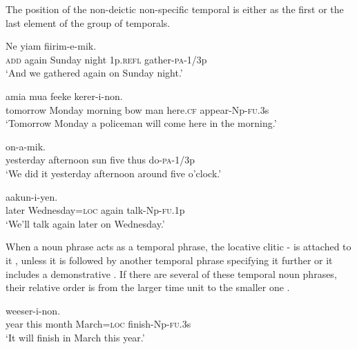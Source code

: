 The position of the non-deictic non-specific temporal is either as the first  or the last element  of the group of temporals.

\ea%
\label{ex:4:x874}
\gll Ne      yiam  fiirim-e-mik. \\
\textsc{add}  again  Sunday  night  1p.\textsc{refl}  gather-\textsc{pa}-1/3p      \\
\glt`And we gathered again on Sunday night.'
\z

\ea%
\label{ex:4:x875}
\gll {}     amia  mua  feeke  kerer-i-non. \\
 tomorrow  Monday  morning  bow  man  here.\textsc{cf}  appear-Np-\textsc{fu}.3s     \\
\glt`Tomorrow Monday a policeman will come here in the morning.'
\z

\ea%
\label{ex:4:x877}
\gll {}      on-a-mik. \\
  yesterday  afternoon  sun  five  thus  do-\textsc{pa}-1/3p    \\
\glt`We did it yesterday afternoon around five o'clock.'
\z

\ea%
\label{ex:4:x876}
\gll {}    aakun-i-yen. \\
  later  Wednesday=\textsc{loc}  again  talk-Np-\textsc{fu}.1p    \\
\glt`We'll talk again later on Wednesday.'
\z

When a noun phrase acts as a temporal phrase, the locative clitic - is attached to it , unless it is followed by another temporal phrase specifying it further or it includes a demonstrative . If there are several of these temporal noun phrases, their relative order is from the larger time unit to the smaller one . 

\ea%
\label{ex:4:x878}
\gll {}     weeser-i-non. \\
   year  this  month  March=\textsc{loc}  finish-Np-\textsc{fu}.3s   \\
\glt`It will finish in March this year.' 
\z

